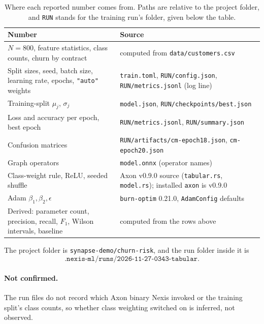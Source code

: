 \documentclass[11pt]{article}
\newcommand{\code}[1]{\texttt{#1}}
\begin{document}
\begin{table}[htbp]
\centering
\caption{Where each reported number comes from. Paths are relative to the
project folder, and \code{RUN} stands for the training run's folder, given
below the table.}
\label{tab:provenance}
\small
\begin{tabular}{>{\raggedright\arraybackslash}p{} >{\raggedright\arraybackslash}p{}}
\toprule
Number & Source \\
\midrule
$N = 800$, feature statistics, class counts, churn by contract & computed from \code{data/customers.csv} \\
Split sizes, seed, batch size, learning rate, epochs, \code{"auto"} weights & \code{train.toml}, \code{RUN/config.json}, \code{RUN/metrics.jsonl} (log line) \\
Training-split $\mu_j$, $\sigma_j$ & \code{model.json}, \code{RUN/checkpoints/best.json} \\
Loss and accuracy per epoch, best epoch & \code{RUN/metrics.jsonl}, \code{RUN/summary.json} \\
Confusion matrices & \code{RUN/artifacts/cm-epoch18.json}, \code{cm-epoch20.json} \\
Graph operators & \code{model.onnx} (operator names) \\
Class-weight rule, ReLU, seeded shuffle & Axon v0.9.0 source (\code{tabular.rs}, \code{model.rs}); installed \code{axon} is v0.9.0 \\
Adam $\beta_1, \beta_2, \epsilon$ & \code{burn-optim} 0.21.0, \code{AdamConfig} defaults \\
Derived: parameter count, precision, recall, $F_1$, Wilson intervals, baseline & computed from the rows above \\
\bottomrule
\end{tabular}
\end{table}

The project folder is \code{synapse-demo/churn-risk}, and the run folder
inside it is
\[
  \code{.nexis-ml/runs/2026-11-27-0343-tabular}.
\]

\paragraph{Not confirmed.} The run files do not record which Axon binary Nexis
invoked or the training split's class counts, so whether class weighting
switched on is inferred, not observed.
\end{document}
